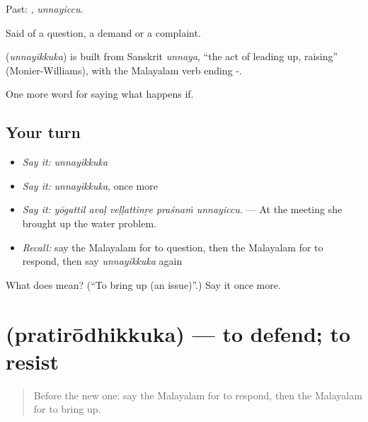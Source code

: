 Past: , \emph{unnayiccu}.

Said of a question, a demand or a complaint.

\begin{cousinweb}
\textbf{} (\emph{unnayikkuka}) is built from Sanskrit \emph{unnaya}, \textquotedblleft{}the act of leading up, raising\textquotedblright{} (Monier-Williams), with the Malayalam verb ending -.
\end{cousinweb}

\begin{grammarlens}[title={What you've built}]
One more word for saying what happens if.
\end{grammarlens}

\subsection*{Your turn}
\begin{itemize}
\raggedright
  \item \emph{Say it:} \emph{unnayikkuka}
  \item \emph{Say it:} \emph{unnayikkuka}, once more
  \item \emph{Say it:} \emph{yōgattil avaḷ veḷḷattinṟe praśnaṁ unnayiccu.} — At the meeting she brought up the water problem.
  \item \emph{Recall:} say the Malayalam for to question, then the Malayalam for to respond, then say \emph{unnayikkuka} again
\end{itemize}

\begin{tcolorbox}[breakable,colback=teal!4,colframe=teal!35!black,title={Before you move on}]
What does  mean? (\textquotedblleft{}To bring up (an issue)\textquotedblright{}.) Say it once more.
\end{tcolorbox}
\section[\texorpdfstring{\ml{പ്രതിരോധിക്കുക} (pratirōdhikkuka)}{പ്രതിരോധിക്കുക (pratirōdhikkuka)}]{ (pratirōdhikkuka) — to defend; to resist}

\label{lesson:ML-C454-pratirodhikkuka}



\begin{quote}
Before the new one: say the Malayalam for to respond, then the Malayalam for to bring up.
\end{quote}


